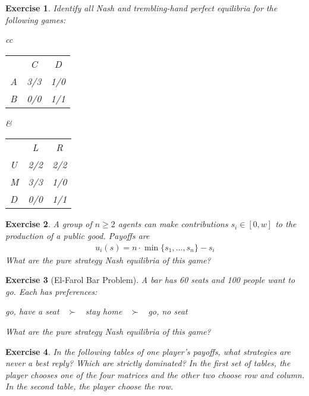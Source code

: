 \documentclass[letter, 11pt]{article}
\theoremstyle{basic}
\newtheorem{exercise}{Exercise}[]
\begin{document}
\begin{spacing}{1.0}
\begin{exercise}
  Identify all Nash and trembling-hand perfect equilibria for the following games:

  \begin{center}
    {\large
      \begin{tabular}{cc}
        \begin{tabular}{rcc}
                                 & C   & D   \\ \cline{2-3}
          \multicolumn{1}{l|}{A} & 3/3 & 1/0 \\
          \multicolumn{1}{l|}{B} & 0/0 & 1/1 \\
        \end{tabular}
        & \hspace{1in}
        \begin{tabular}{rcc}
                                 & L   & R   \\ \cline{2-3}
          \multicolumn{1}{l|}{U} & 2/2 & 2/2 \\
          \multicolumn{1}{l|}{M} & 3/3 & 1/0 \\
          \multicolumn{1}{l|}{D} & 0/0 & 1/1 \\
        \end{tabular}
      \end{tabular}}
  \end{center}
\end{exercise}

\begin{exercise}
  A group of $n \ge 2$ agents can make contributions $s_i \in [0,w]$ to the
  production of a public good. Payoffs are
  \begin{align*}
    u_i(s) = n \cdot \min\{s_1, \ldots, s_n\} - s_i
  \end{align*}
  What are the pure strategy Nash equilibria of this game?
\end{exercise}

\begin{exercise}[El-Farol Bar Problem]
  A bar has 60 seats and 100 people want to go. Each has preferences:
  \begin{center}
    go, have a seat $\;\; \succ \;\;$ stay home $\;\; \succ \;\;$ go, no seat
  \end{center}
  What are the pure strategy Nash equilibria of this game? 
\end{exercise}

\begin{exercise}
  In the following tables of one player's payoffs, what strategies are never a
  best reply? Which are strictly dominated? In the first set of tables, the player
  chooses one of the four matrices and the other two choose row and column. In the
  second table, the player choose the row.


\end{exercise}
\end{spacing}
\end{document}
